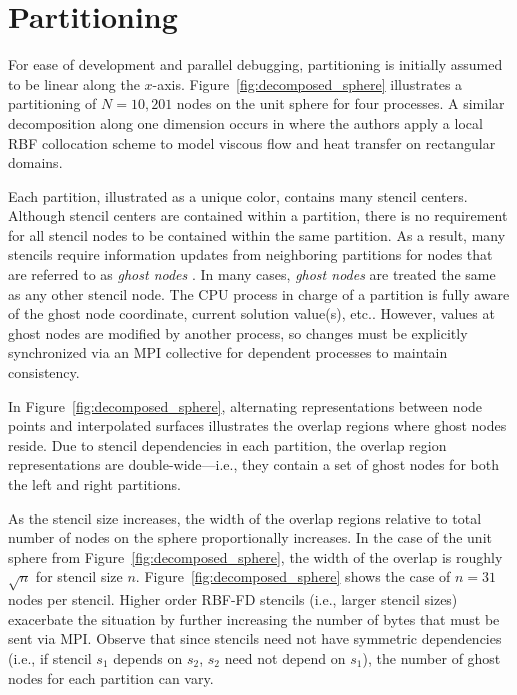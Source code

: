 \documentclass{report}
\begin{document}
\section{Partitioning}

For ease of development and parallel debugging, partitioning is initially
assumed to be linear along the $x$-axis. Figure~\ref{fig:decomposed_sphere} illustrates a partitioning of
$N=10,201$ nodes on the unit sphere for four processes. A similar decomposition along one dimension occurs in \cite{Divo2007} where the authors apply a local RBF collocation scheme to model viscous flow and heat transfer on rectangular domains. 

Each partition, illustrated as a unique color, contains many stencil centers. 
Although stencil centers are contained within a partition, there is no requirement for all stencil nodes to be contained within the same partition. As a result, many stencils require information updates from neighboring partitions for nodes that are referred to as \emph{ghost nodes} \cite{NeEDREF}. %
In many cases, \emph{ghost nodes} are treated the same as any other stencil node. The CPU process in charge of a partition is fully aware of the ghost node coordinate, current solution value(s), etc.. However, values at ghost nodes are modified by another process, so changes must be explicitly synchronized via an MPI collective for dependent processes to maintain consistency. 

In Figure~\ref{fig:decomposed_sphere}, alternating representations between node points and interpolated surfaces illustrates the
overlap regions where ghost nodes reside. Due to stencil dependencies in each partition, the overlap region representations are double-wide---i.e., they contain a set of ghost nodes for both the left and right partitions. 

As the stencil size increases, the width of the
overlap regions relative to total number of nodes on the sphere proportionally increases. In the case of the unit sphere from Figure~\ref{fig:decomposed_sphere}, the width of the overlap is roughly $\sqrt{n}$ for stencil size $n$. Figure~\ref{fig:decomposed_sphere} shows the case of $n=31$ nodes per stencil. Higher order RBF-FD stencils (i.e., larger stencil sizes) exacerbate the situation by further increasing the number of bytes that must be sent via MPI. Observe that since stencils need not have symmetric dependencies (i.e., if stencil $s_1$ depends on $s_2$, $s_2$ need not depend on $s_1$), the number of ghost nodes for each partition can vary.
\end{document}
